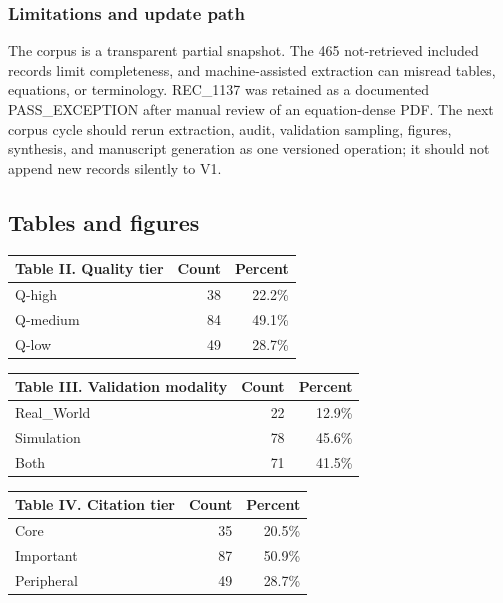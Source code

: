 \documentclass[
  journal,
  10pt]{IEEEtran}
\newcounter{none} %
\begin{document}
\subsubsection{Limitations and update
path}\label{limitations-and-update-path}

The corpus is a transparent partial snapshot. The 465 not-retrieved
included records limit completeness, and machine-assisted extraction can
misread tables, equations, or terminology. REC\_1137 was retained as a
documented PASS\_EXCEPTION after manual review of an equation-dense PDF.
The next corpus cycle should rerun extraction, audit, validation
sampling, figures, synthesis, and manuscript generation as one versioned
operation; it should not append new records silently to V1.

\subsection{Tables and figures}\label{tables-and-figures}

{\def\LTcaptype{none} %
\begin{tabular}{lrr}
\toprule
Table II. Quality tier & Count & Percent \\
\midrule

\bottomrule

Q-high & 38 & 22.2\% \\
Q-medium & 84 & 49.1\% \\
Q-low & 49 & 28.7\% \\
\end{tabular}
}

{\def\LTcaptype{none} %
\begin{tabular}{lrr}
\toprule
Table III. Validation modality & Count & Percent \\
\midrule

\bottomrule

Real\_World & 22 & 12.9\% \\
Simulation & 78 & 45.6\% \\
Both & 71 & 41.5\% \\
\end{tabular}
}

{\def\LTcaptype{none} %
\begin{tabular}{lrr}
\toprule
Table IV. Citation tier & Count & Percent \\
\midrule

\bottomrule

Core & 35 & 20.5\% \\
Important & 87 & 50.9\% \\
Peripheral & 49 & 28.7\% \\
\end{tabular}
}
\end{document}
